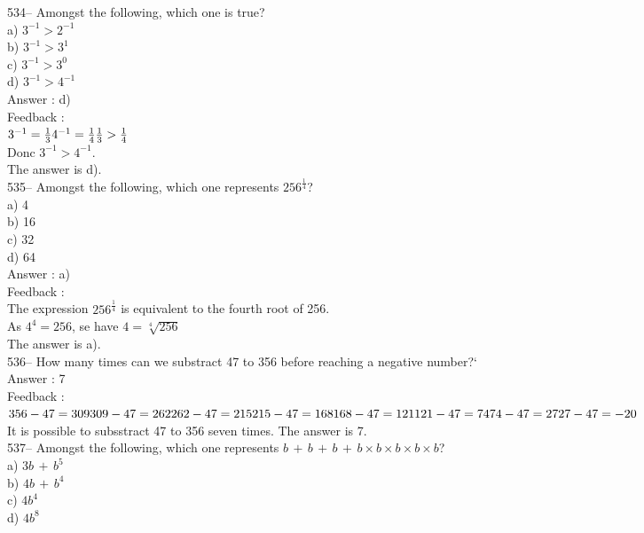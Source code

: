 ﻿\documentclass[letterpaper, 12pt]{article}
\begin{document}
534-- Amongst the following, which one is true?\\
a) $3^{-1}>2^{-1}$\\
b) $3^{-1}>3^{1}$\\
c) $3^{-1}>3^{0}$\\
d) $3^{-1}>4^{-1}$\\

Answer : d)\\

Feedback : \\
$3^{-1}=\frac{1}{3}\\[2mm]
4^{-1}=\frac{1}{4}\\[2mm]
\frac{1}{3}>\frac{1}{4}$\\[2mm]
Donc $3^{-1}>4^{-1}$.\\[2mm]
The answer is d).\\

535-- Amongst the following, which one represents
$256^{\frac{1}{4}}$?\\
a) 4\\
b) 16\\
c) 32\\
d) 64\\

Answer : a)\\

Feedback : \\
The expression $256^{\frac{1}{4}}$ is equivalent to the fourth root of 256.  \\
As $4^{4} = 256$, se have $4=\sqrt[4]{256}$ \\
The answer is a).\\

536-- How many times can we substract 47 to 356 before reaching a negative number?`\\

Answer : 7\\

Feedback : \\
$356-47=309\\
309-47=262\\
262-47=215\\
215-47=168\\
168-47=121\\
121-47=74\\
74-47=27\\
27-47=-20$\\
It is possible to subsstract 47 to 356 seven times.  The answer is 7.\\


537-- Amongst the following, which one represents
$b\,+\,b\,+\,b\,+\,b\times b\times b \times b \times b$?\\
a) $3b\,+\,b^{5}$\\
b) $4b\,+\,b^{4}$\\
c) $4b^{4}$\\
d) $4b^{8}$\\
\end{document}
